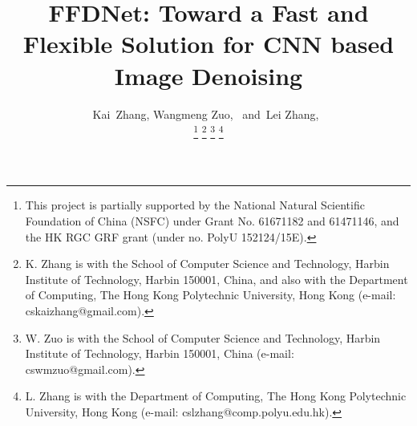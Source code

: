 \documentclass[journal]{IEEEtran}
\begin{document}
%
\title{FFDNet: Toward a Fast and Flexible Solution for CNN based Image Denoising}

\author{Kai~Zhang,
        Wangmeng Zuo,~
        and~Lei Zhang,~

\thanks{This project is partially supported by the National Natural Scientific Foundation of China (NSFC) under Grant No. 61671182 and 61471146, and the HK RGC GRF grant (under no. PolyU 152124/15E).}
\thanks{K. Zhang is with the School of Computer Science and Technology, Harbin
Institute of Technology, Harbin 150001, China, and also with the Department
of Computing, The Hong Kong Polytechnic University, Hong Kong (e-mail: cskaizhang@gmail.com).}%
\thanks{W. Zuo is with the School of Computer Science and
Technology, Harbin Institute of Technology, Harbin 150001, China (e-mail:
cswmzuo@gmail.com).}
\thanks{L. Zhang is with the Department of Computing, The Hong Kong
Polytechnic University, Hong Kong (e-mail: cslzhang@comp.polyu.edu.hk).}
}



%





\maketitle
\end{document}
